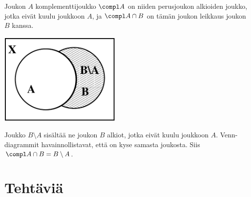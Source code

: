 Joukon $A$ komplementtijoukko $\compl A$ on niiden perusjoukon alkioiden joukko, jotka eivät kuulu joukkoon $A$, ja $\compl A\cap B$ on tämän joukon leikkaus joukon $B$ kanssa.


\begin{center}
\includegraphics[width=6cm]{kuvat/esim4-3_2}
\end{center}

Joukko $B \setminus A$ sisältää ne joukon $B$ alkiot, jotka eivät kuulu joukkoon $A$.
Venn-diagrammit havainnollistavat, että on kyse samasta joukosta. Siis $\compl A\cap B = B \setminus A$.


\newpage


\section*{Tehtäviä}

